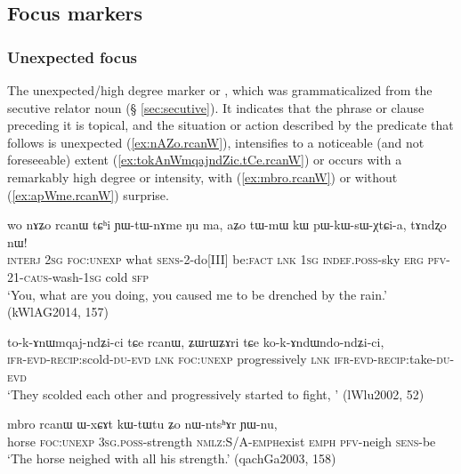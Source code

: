  \subsection{Focus markers} \label{sec:focus}
   \subsubsection{Unexpected focus} \label{sec:unexpected}
  The unexpected/high degree marker  or , which was grammaticalized from the  secutive relator noun  (§ \ref{sec:secutive}). It indicates that the phrase or clause preceding it is topical, and the situation or action described by the predicate that follows is unexpected (\ref{ex:nAZo.rcanW}), intensifies to a noticeable (and not foreseeable) extent (\ref{ex:tokAnWmqajndZic.tCe.rcanW}) or occurs with a remarkably high degree or intensity, with  (\ref{ex:mbro.rcanW}) or without (\ref{ex:apWme.rcanW}) surprise.

\begin{exe}
\ex \label{ex:nAZo.rcanW}
 \gll  wo nɤʑo rcanɯ tɕʰi ɲɯ-tɯ-nɤme ŋu ma,  aʑo tɯ-mɯ kɯ pɯ-kɯ-sɯ-χtɕi-a, tɤndʐo nɯ! \\
 \textsc{interj} \textsc{2sg} \textsc{foc}:\textsc{unexp} what \textsc{sens}-2-do[III] be:\textsc{fact} \textsc{lnk} \textsc{1sg} \textsc{indef}.\textsc{poss}-sky \textsc{erg} \textsc{pfv}-2\fl{}1-\textsc{caus}-wash-\textsc{1sg} cold \textsc{sfp} \\
\glt `You, what are you doing, you caused me to be drenched by the rain.' (kWlAG2014, 157) \\
\end{exe}

\begin{exe}
\ex \label{ex:tokAnWmqajndZic.tCe.rcanW}
 \gll to-k-ɤnɯmqaj-ndʑi-ci tɕe rcanɯ, ʑɯrɯʑɤri tɕe ko-k-ɤndɯndo-ndʑi-ci, \\
 \textsc{ifr}-\textsc{evd}-\textsc{recip}:scold-\textsc{du-evd} \textsc{lnk}  \textsc{foc}:\textsc{unexp} progressively \textsc{lnk}   \textsc{ifr}-\textsc{evd}-\textsc{recip}:take-\textsc{du-evd} \\
 \glt `They scolded each other and progressively started to fight, ' (lWlu2002, 52)
\end{exe}

 \begin{exe}
\ex \label{ex:mbro.rcanW}
 \gll mbro rcanɯ ɯ-xɕɤt kɯ-tɯ\redp{}tu ʑo nɯ-ntsʰɤr ɲɯ-nu, \\
 horse \textsc{foc}:\textsc{unexp} \textsc{3sg}.\textsc{poss}-strength \textsc{nmlz}:S/A-\textsc{emph}\redp{}exist \textsc{emph} \textsc{pfv}-neigh \textsc{sens}-be \\ 
 \glt `The horse neighed with all his strength.' (qachGa2003, 158)
\end{exe}

